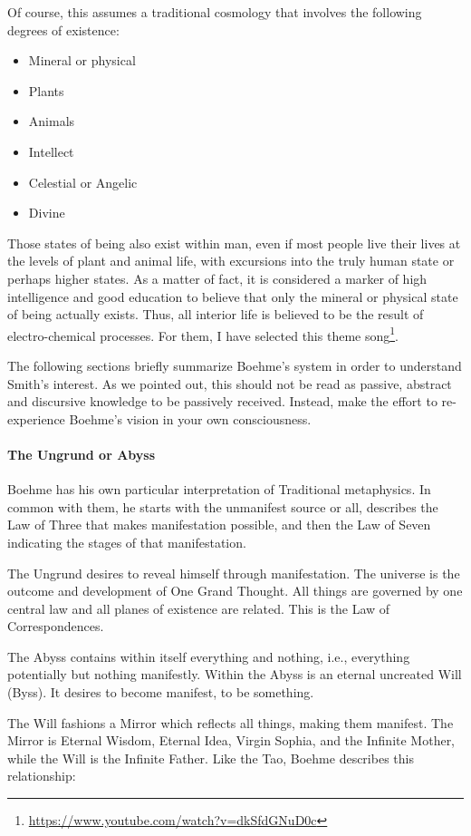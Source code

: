 Of course, this assumes a traditional cosmology that involves the following degrees of existence:

\begin{itemize}
\item Mineral or physical 
\item Plants 
\item Animals 
\item Intellect 
\item Celestial or Angelic 
\item Divine 
\end{itemize}
Those states of being also exist within man, even if most people live their lives at the levels of plant and animal life, with excursions into the truly human state or perhaps higher states. As a matter of fact, it is considered a marker of high intelligence and good education to believe that only the mineral or physical state of being actually exists. Thus, all interior life is believed to be the result of electro-chemical processes. For them, I have selected this theme song\footnote{\url{https://www.youtube.com/watch?v=dkSfdGNuD0c}}.

The following sections briefly summarize Boehme's system in order to understand Smith's interest. As we pointed out, this should not be read as passive, abstract and discursive knowledge to be passively received. Instead, make the effort to re-experience Boehme's vision in your own consciousness.

\paragraph{The Ungrund or Abyss}
Boehme has his own particular interpretation of Traditional metaphysics. In common with them, he starts with the unmanifest source or all, describes the Law of Three that makes manifestation possible, and then the Law of Seven indicating the stages of that manifestation.

The Ungrund desires to reveal himself through manifestation. The universe is the outcome and development of One Grand Thought. All things are governed by one central law and all planes of existence are related. This is the Law of Correspondences.

The Abyss contains within itself everything and nothing, i.e., everything potentially but nothing manifestly. Within the Abyss is an eternal uncreated Will (Byss). It desires to become manifest, to be something.

The Will fashions a Mirror which reflects all things, making them manifest. The Mirror is Eternal Wisdom, Eternal Idea, Virgin Sophia, and the Infinite Mother, while the Will is the Infinite Father. Like the Tao, Boehme describes this relationship:

